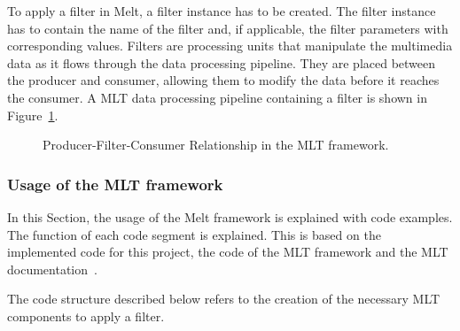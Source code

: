 \documentclass[../MasterThesis.tex]{subfiles}
\begin{document}
To apply a filter in Melt, a filter instance has to be created. The filter instance has to contain the name of the filter and, if applicable, the filter parameters with corresponding values.
Filters are processing units that manipulate the multimedia data as it flows through the data processing pipeline. They are placed between the producer and consumer, allowing them to modify the data before it reaches the consumer. A MLT data processing pipeline containing a filter is shown in Figure~\ref{fig:producer_filter_consumer}.



\begin{figure}[H]
	\centering
	\caption{Producer-Filter-Consumer Relationship in the MLT framework.}
	\label{fig:producer_filter_consumer}
\end{figure}



\subsubsection*{Usage of the MLT framework}

In this Section, the usage of the Melt framework is explained with code examples. The function of each code segment is explained.
This is based on the implemented code for this project, the code of the MLT framework and the MLT documentation~\cite{melt_code, melt}.

The code structure described below refers to the creation of the necessary MLT components to apply a filter.
\end{document}
